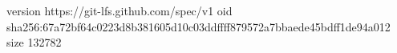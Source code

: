 version https://git-lfs.github.com/spec/v1
oid sha256:67a72bf64c0223d8b381605d10c03ddffff879572a7bbaede45bdff1de94a012
size 132782
